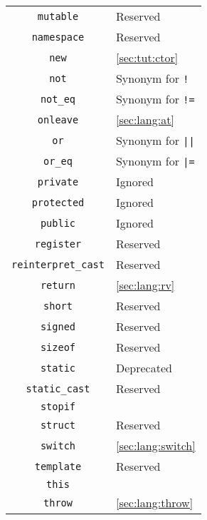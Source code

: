 \begin{tabular}{|c|l|}
 \lstinline"mutable" & Reserved                                 \\
\lstinline"namespace" & Reserved                                 \\
     \lstinline"new" & \autoref{sec:tut:ctor}                   \\
     \lstinline"not" & Synonym for \verb|!|                     \\
  \lstinline"not_eq" & Synonym for \verb|!=|                    \\
 \lstinline"onleave" & \autoref{sec:lang:at}                    \\
      \lstinline"or" & Synonym for \verb-||-                    \\
   \lstinline"or_eq" & Synonym for \verb-|=-                    \\
 \lstinline"private" & Ignored                                  \\
\lstinline"protected" & Ignored                                  \\
  \lstinline"public" & Ignored                                  \\
\lstinline"register" & Reserved                                 \\
\lstinline"reinterpret_cast" & Reserved                                 \\
  \lstinline"return" & \autoref{sec:lang:rv}                    \\
   \lstinline"short" & Reserved                                 \\
  \lstinline"signed" & Reserved                                 \\
  \lstinline"sizeof" & Reserved                                 \\
  \lstinline"static" & Deprecated                               \\
\lstinline"static_cast" & Reserved                                 \\
  \lstinline"stopif" &                                          \\
  \lstinline"struct" & Reserved                                 \\
  \lstinline"switch" & \autoref{sec:lang:switch}                \\
\lstinline"template" & Reserved                                 \\
    \lstinline"this" &                                          \\
   \lstinline"throw" & \autoref{sec:lang:throw}                 \\

\end{tabular}

